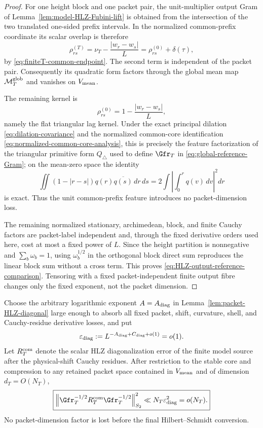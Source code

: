 \begin{proof}
For one height block and one packet pair, the unit-multiplier output Gram of
Lemma~\ref{lem:model-HLZ-Fubini-lift} is obtained from the intersection of the
two translated one-sided prefix intervals.  In the normalized common-prefix
coordinate its scalar overlap is therefore
\[
\rho_{rs}^{(T)}
=\nu_T-\frac{|w_r-w_s|}{L}
=\rho_{rs}^{(0)}+\delta(\tau),
\]
by \eqref{eq:finiteT-common-endpoint}.  The second term is independent of the
packet pair.  Consequently its quadratic form factors through the global mean
map $\mathcal M_T^{\rm glob}$ and vanishes on $V_{\rm mean}$.

The remaining kernel is
\[
\rho_{rs}^{(0)}=1-\frac{|w_r-w_s|}{L},
\]
namely the flat triangular lag kernel.  Under the exact principal dilation
\eqref{eq:dilation-covariance} and the normalized common-core identification
\eqref{eq:normalized-common-core-analysis}, this is precisely the feature
factorization of the triangular primitive form $Q_\triangle$ used to define
$\Gfr_T$ in \eqref{eq:global-reference-Gram}; on the mean-zero space the
identity
\[
\iint(1-|r-s|)q(r)\overline{q(s)}\,dr\,ds
=2\int\left|\int_0^rq(v)\,dv\right|^2dr
\]
is exact.  Thus the unit common-prefix feature introduces no packet-dimension
loss.

The remaining normalized stationary, archimedean, block, and finite Cauchy
factors are packet-label independent and, through the fixed derivative orders
used here, cost at most a fixed power of $L$.  Since the height partition is
nonnegative and $\sum_b\omega_b=1$, using $\omega_b^{1/2}$ in the orthogonal
block direct sum reproduces the linear block sum without a cross term.
This proves \eqref{eq:HLZ-output-reference-comparison}.  Tensoring with a
fixed packet-independent finite output fibre changes only the fixed exponent,
not the packet dimension.
\end{proof}

\begin{lemma}
\label{lem:HLZ-diagonal-operator-lift}
Choose the arbitrary logarithmic exponent $A=A_{\rm diag}$ in
Lemma~\ref{lem:packet-HLZ-diagonal} large enough to absorb all fixed packet,
shift, curvature, shell, and Cauchy-residue derivative losses, and put
\[
\varepsilon_{\rm diag}
:=L^{-A_{\rm diag}+C_{\rm diag}+o(1)}=o(1).
\]
Let $R_T^{\rm com}$ denote the scalar HLZ diagonalization error of the finite
model source after the physical-shift Cauchy residues. After restriction to the
stable core and compression to any retained packet space contained in
$V_{\rm mean}$ and of dimension $d_T=O(N_T)$,
\begin{equation}
\boxed{
\left\|\Gfr_T^{-1/2}R_T^{\rm com}\Gfr_T^{-1/2}\right\|_{S_2}^2
\ll N_T\varepsilon_{\rm diag}^2=o(N_T).
}
\label{eq:HLZ-diagonal-relative-HS}
\end{equation}
No packet-dimension factor is lost before the final Hilbert--Schmidt conversion.
\end{lemma}


